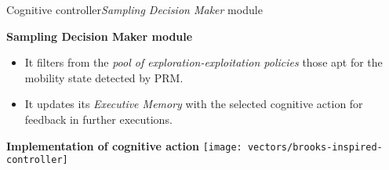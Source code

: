 \begin{frame}{Cognitive controller}{\emph{Sampling Decision Maker} module}
\small
\vspace{-0.3cm}
\begin{block}{\small \textbf{Sampling Decision Maker module}}
  \begin{itemize}
      \item It filters from the \emph{pool of exploration-exploitation policies} those apt for the mobility state detected by PRM.
      \item It updates its \emph{Executive Memory} with the selected cognitive action for feedback in further executions.
  \end{itemize}
\end{block}

\begin{block}{\small \textbf{Implementation of cognitive action}}
{
  \centering
  \texttt{[image: vectors/brooks-inspired-controller]}
}
\end{block}





\end{frame}
